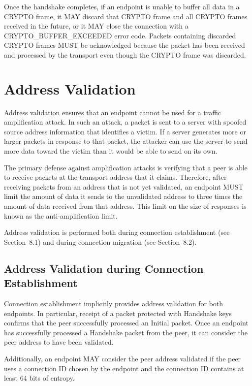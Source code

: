 \documentclass{article}
\begin{document}
Once the handshake completes, if an endpoint is unable to buffer all data in a CRYPTO frame, it MAY discard that CRYPTO frame and all CRYPTO frames received in the future, or it MAY close the connection with a CRYPTO\_BUFFER\_EXCEEDED error code.  Packets containing discarded CRYPTO frames MUST be acknowledged because the packet has been received and processed by the transport even though the CRYPTO frame was discarded.

\section{Address Validation}

Address validation ensures that an endpoint cannot be used for a traffic amplification attack.  In such an attack, a packet is sent to a server with spoofed source address information that identifies a victim.  If a server generates more or larger packets in response to that packet, the attacker can use the server to send more data toward the victim than it would be able to send on its own.

The primary defense against amplification attacks is verifying that a peer is able to receive packets at the transport address that it claims.  Therefore, after receiving packets from an address that is not yet validated, an endpoint MUST limit the amount of data it sends to the unvalidated address to three times the amount of data received from that address.  This limit on the size of responses is known as the anti-amplification limit.

Address validation is performed both during connection establishment (see Section~8.1) and during connection migration (see Section~8.2).

\subsection{Address Validation during Connection Establishment}

Connection establishment implicitly provides address validation for both endpoints.  In particular, receipt of a packet protected with Handshake keys confirms that the peer successfully processed an Initial packet.  Once an endpoint has successfully processed a Handshake packet from the peer, it can consider the peer address to have been validated.

Additionally, an endpoint MAY consider the peer address validated if the peer uses a connection ID chosen by the endpoint and the connection ID contains at least 64 bits of entropy.
\end{document}
